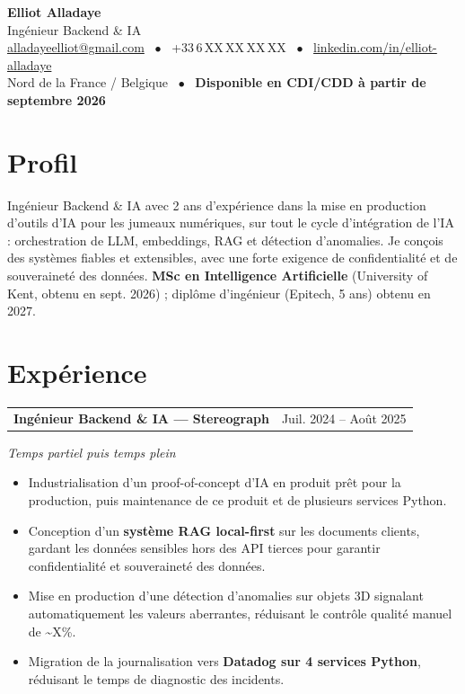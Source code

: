 \documentclass[10pt,a4paper]{article}
\makeatletter
\newcommand{\entry}[2]{%
  \vspace{1pt}\noindent\begin{tabular*}{\textwidth}{@{}l@{\extracolsep{\fill}}r@{}}
  \textbf{#1} & #2 \\
  \end{tabular*}\par}
\newcommand{\subentry}[1]{\noindent\textit{#1}\par\vspace{1pt}}
\makeatother
\begin{document}
\begin{center}
  {\Huge\bfseries Elliot Alladaye}\\[3pt]
  {\large\color{accent} Ingénieur Backend \& IA}\\[5pt]
  \small
  \href{mailto:alladayeelliot@gmail.com}{alladayeelliot@gmail.com} ~$\bullet$~
  +33\,6\,XX\,XX\,XX\,XX ~$\bullet$~
  \href{https://www.linkedin.com/in/elliot-alladaye}{linkedin.com/in/elliot-alladaye}\\[2pt]
  Nord de la France / Belgique ~$\bullet$~ \textbf{Disponible en CDI/CDD à partir de septembre 2026}
\end{center}
\vspace{2pt}

\section{Profil}
Ingénieur Backend \& IA avec 2 ans d'expérience dans la mise en production d'outils d'IA pour les jumeaux numériques, sur tout le cycle d'intégration de l'IA : orchestration de LLM, embeddings, RAG et détection d'anomalies. Je conçois des systèmes fiables et extensibles, avec une forte exigence de confidentialité et de souveraineté des données. \textbf{MSc en Intelligence Artificielle} (University of Kent, obtenu en sept. 2026) ; diplôme d'ingénieur (Epitech, 5 ans) obtenu en 2027.

\section{Expérience}

\entry{Ingénieur Backend \& IA --- Stereograph}{Juil. 2024 -- Août 2025}
\subentry{Temps partiel puis temps plein}
\begin{itemize}
  \item Industrialisation d'un proof-of-concept d'IA en produit prêt pour la production, puis maintenance de ce produit et de plusieurs services Python.
  \item Conception d'un \textbf{système RAG local-first} sur les documents clients, gardant les données sensibles hors des API tierces pour garantir confidentialité et souveraineté des données.
  \item Mise en production d'une détection d'anomalies sur objets 3D signalant automatiquement les valeurs aberrantes, réduisant le contrôle qualité manuel de \textasciitilde X\%.
  \item Migration de la journalisation vers \textbf{Datadog sur 4 services Python}, réduisant le temps de diagnostic des incidents.
\end{itemize}
\end{document}

